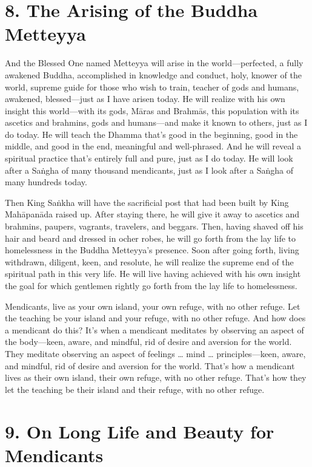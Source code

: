 \documentclass[12pt,openany]{book}%
\begin{document}
\section*{8. The Arising of the Buddha Metteyya }

And the Blessed One named Metteyya will arise in the world—perfected, a fully awakened Buddha, accomplished in knowledge and conduct, holy, knower of the world, supreme guide for those who wish to train, teacher of gods and humans, awakened, blessed—just as I have arisen today. He will realize with his own insight this world—with its gods, \textsanskrit{Māras} and \textsanskrit{Brahmās}, this population with its ascetics and brahmins, gods and humans—and make it known to others, just as I do today. He will teach the Dhamma that’s good in the beginning, good in the middle, and good in the end, meaningful and well-phrased. And he will reveal a spiritual practice that’s entirely full and pure, just as I do today. He will look after a \textsanskrit{Saṅgha} of many thousand mendicants, just as I look after a \textsanskrit{Saṅgha} of many hundreds today. 

Then King \textsanskrit{Saṅkha} will have the sacrificial post that had been built by King \textsanskrit{Mahāpanāda} raised up. After staying there, he will give it away to ascetics and brahmins, paupers, vagrants, travelers, and beggars. Then, having shaved off his hair and beard and dressed in ocher robes, he will go forth from the lay life to homelessness in the Buddha Metteyya’s presence. Soon after going forth, living withdrawn, diligent, keen, and resolute, he will realize the supreme end of the spiritual path in this very life. He will live having achieved with his own insight the goal for which gentlemen rightly go forth from the lay life to homelessness. 

Mendicants, live as your own island, your own refuge, with no other refuge. Let the teaching be your island and your refuge, with no other refuge. And how does a mendicant do this? It’s when a mendicant meditates by observing an aspect of the body—keen, aware, and mindful, rid of desire and aversion for the world. They meditate observing an aspect of feelings … mind … principles—keen, aware, and mindful, rid of desire and aversion for the world. That’s how a mendicant lives as their own island, their own refuge, with no other refuge. That’s how they let the teaching be their island and their refuge, with no other refuge. 

\section*{9. On Long Life and Beauty for Mendicants }
\end{document}
